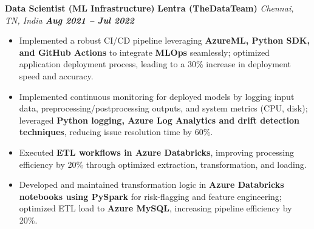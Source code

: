 \documentclass[10pt,letter]{article}
\newcommand{\boldlarger}[1]{\textbf{\normalsize #1}}
\begin{document}
\boldlarger{Data Scientist (ML Infrastructure)} \hfill \boldlarger{Lentra (TheDataTeam)} \hspace{4em} \hfill \textit{Chennai, TN, India \hspace{1em} \boldlarger{Aug 2021 -- Jul 2022}}\\
\vspace{-16pt}
\begin{itemize}

  \item Implemented a robust CI/CD pipeline leveraging \textbf{AzureML, Python SDK, and GitHub Actions} to integrate \textbf{MLOps} seamlessly; optimized application deployment process, leading to a 30\% increase in deployment speed and accuracy.

  \item Implemented continuous monitoring for deployed models by logging input data, preprocessing/postprocessing outputs, and system metrics (CPU, disk); leveraged \textbf{Python logging, Azure Log Analytics and drift detection techniques}, reducing issue resolution time by 60\%.
  
  \item Executed \textbf{ETL workflows in Azure Databricks}, improving processing efficiency by 20\% through optimized extraction, transformation, and loading.
  
  \item Developed and maintained transformation logic in \textbf{Azure Databricks notebooks using PySpark} for risk-flagging and feature engineering; optimized ETL load to \textbf{Azure MySQL}, increasing pipeline efficiency by 20\%.

\end{itemize}

\end{document}

